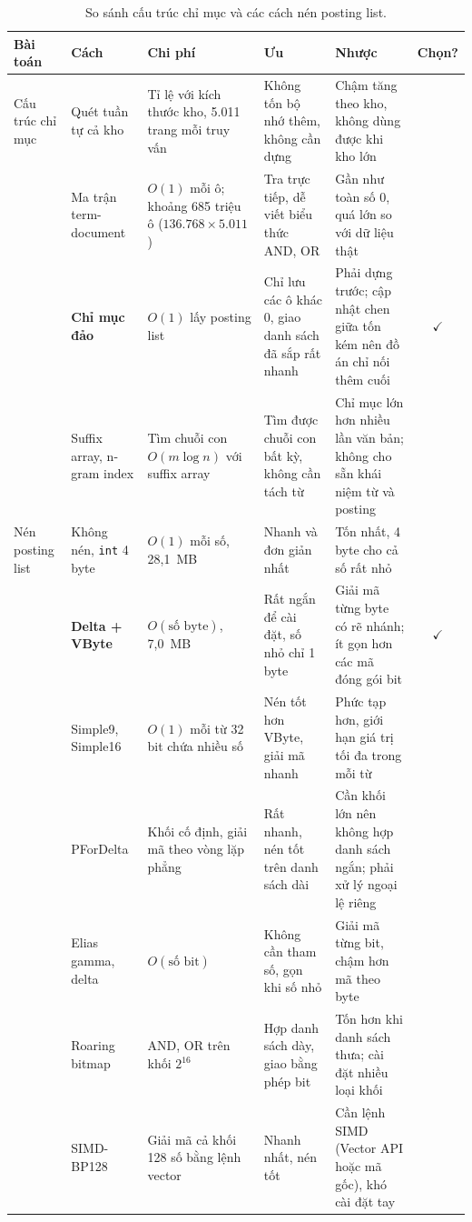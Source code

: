 \documentclass[9pt,twocolumn,a4paper]{extarticle}
\newcommand{\code}[1]{\texttt{#1}}
\begin{document}
\begin{table}[!t]
\centering
\caption{So sánh cấu trúc chỉ mục và các cách nén posting list.}
\label{tab:cmp2b}
\footnotesize
\setlength{\tabcolsep}{3pt}
\begin{tabular}{@{}>{\raggedright\arraybackslash}p{1.9cm}>{\raggedright\arraybackslash}p{3.1cm}>{\raggedright\arraybackslash}p{2.6cm}>{\raggedright\arraybackslash}p{3.9cm}>{\raggedright\arraybackslash}p{4.1cm}c@{}}
\toprule
Bài toán & Cách & Chi phí & Ưu & Nhược & Chọn? \\
\midrule
Cấu trúc chỉ mục
& Quét tuần tự cả kho & Tỉ lệ với kích thước kho, 5.011 trang mỗi truy vấn & Không tốn bộ nhớ thêm, không cần dựng & Chậm tăng theo kho, không dùng được khi kho lớn & \\
& Ma trận term-document & $O(1)$ mỗi ô; khoảng 685 triệu ô ($136.768\times5.011$) & Tra trực tiếp, dễ viết biểu thức AND, OR & Gần như toàn số 0, quá lớn so với dữ liệu thật & \\
& \textbf{Chỉ mục đảo} & $O(1)$ lấy posting list & Chỉ lưu các ô khác 0, giao danh sách đã sắp rất nhanh & Phải dựng trước; cập nhật chen giữa tốn kém nên đồ án chỉ nối thêm cuối & $\checkmark$ \\
& Suffix array, n-gram index & Tìm chuỗi con $O(m\log n)$ với suffix array & Tìm được chuỗi con bất kỳ, không cần tách từ & Chỉ mục lớn hơn nhiều lần văn bản; không cho sẵn khái niệm từ và posting & \\
\midrule
Nén posting list
& Không nén, \code{int} 4 byte & $O(1)$ mỗi số, 28,1~MB & Nhanh và đơn giản nhất & Tốn nhất, 4 byte cho cả số rất nhỏ & \\
& \textbf{Delta + VByte} & $O(\text{số byte})$, 7,0~MB & Rất ngắn để cài đặt, số nhỏ chỉ 1 byte & Giải mã từng byte có rẽ nhánh; ít gọn hơn các mã đóng gói bit & $\checkmark$ \\
& Simple9, Simple16 & $O(1)$ mỗi từ 32 bit chứa nhiều số & Nén tốt hơn VByte, giải mã nhanh & Phức tạp hơn, giới hạn giá trị tối đa trong mỗi từ & \\
& PForDelta & Khối cố định, giải mã theo vòng lặp phẳng & Rất nhanh, nén tốt trên danh sách dài & Cần khối lớn nên không hợp danh sách ngắn; phải xử lý ngoại lệ riêng & \\
& Elias gamma, delta & $O(\text{số bit})$ & Không cần tham số, gọn khi số nhỏ & Giải mã từng bit, chậm hơn mã theo byte & \\
& Roaring bitmap & AND, OR trên khối $2^{16}$ & Hợp danh sách dày, giao bằng phép bit & Tốn hơn khi danh sách thưa; cài đặt nhiều loại khối & \\
& SIMD-BP128 & Giải mã cả khối 128 số bằng lệnh vector & Nhanh nhất, nén tốt & Cần lệnh SIMD (Vector API hoặc mã gốc), khó cài đặt tay & \\
\bottomrule
\end{tabular}
\end{table}
\end{document}
